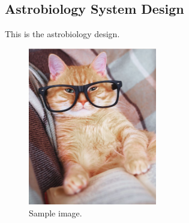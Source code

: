 \subsection{Astrobiology System Design}
\label{sec:Astrobiology-Design}

This is the astrobiology design.

\begin{figure}[h!]
	\begin{center}
		\includegraphics[width=0.5\textwidth]{figures/sample.png}
		\caption{Sample image.}
		\label{fig:astrobio-system}
	\end{center}
\end{figure}

